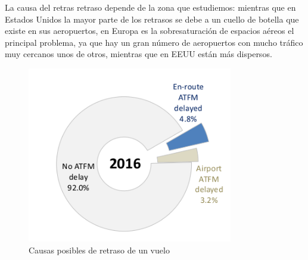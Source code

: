 La causa del retras retraso depende de la zona que estudiemos: mientras que en Estados Unidos la mayor parte de los retrasos se debe a un cuello de botella que existe en sus aeropuertos, en Europa es la sobresaturación de espacios aéreos el principal problema, ya que hay un gran número de aeropuertos con mucho tráfico muy cercanos unos de otros, mientras que en EEUU están más dispersos.
\begin{figure}[H]
	\begin{center}
		\centering
		\includegraphics[width=0.8\textwidth]{./imagenes/introduccion/tiposRetrasos.png}
		\caption{Causas posibles de retraso de un vuelo}
		\label{fig: Causas posibles de retraso de un vuelo}
	\end{center}
\end{figure}

